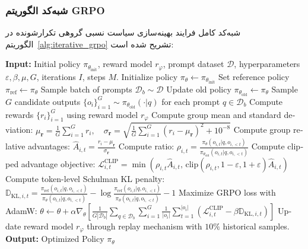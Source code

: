 \subsubsection*{شبه‌کد الگوریتم GRPO}

شبه‌کد کامل فرایند بهینه‌سازی سیاست نسبی گروهی تکرارشونده در الگوریتم~\ref{alg:iterative_grpo} تشریح شده است:

\begin{latin}
\begin{algorithm}[H]
\caption{Iterative Group Relative Policy Optimization (GRPO)}
\label{alg:iterative_grpo}
\begin{algorithmic}[1]
\State \textbf{Input:} Initial policy $\pi_{\theta_{\text{init}}}$, reward model $r_\varphi$, prompt dataset $\mathcal{D}$, hyperparameters $\varepsilon, \beta, \mu, G$, iterations $I$, steps $M$.
\State Initialize policy $\pi_\theta \leftarrow \pi_{\theta_{\text{init}}}$
    \State Set reference policy $\pi_{\text{ref}} \leftarrow \pi_\theta$
        \State Sample batch of prompts $\mathcal{D}_b \sim \mathcal{D}$
        \State Update old policy $\pi_{\theta_{\text{old}}} \leftarrow \pi_\theta$
        \State Sample $G$ candidate outputs $\{o_i\}_{i=1}^G \sim \pi_{\theta_{\text{old}}}(\cdot | q)$ for each prompt $q \in \mathcal{D}_b$
        \State Compute rewards $\{r_i\}_{i=1}^G$ using reward model $r_\varphi$
        \State Compute group mean and standard deviation:
        \State \quad $\mu_{\mathbf{r}} = \frac{1}{G}\sum_{i=1}^G r_i, \quad \sigma_{\mathbf{r}} = \sqrt{\frac{1}{G}\sum_{i=1}^G (r_i - \mu_{\mathbf{r}})^2 + 10^{-8}}$
        \State Compute group relative advantages: $\hat{A}_{i,t} = \frac{r_i - \mu_{\mathbf{r}}}{\sigma_{\mathbf{r}}}$
            \State Compute ratio: $\rho_{i,t} = \frac{\pi_\theta(o_{i,t} | q, o_{i,<t})}{\pi_{\theta_{\text{old}}}(o_{i,t} | q, o_{i,<t})}$
            \State Compute clipped advantage objective:
            \State \quad $\mathcal{L}_{i,t}^{\text{CLIP}} = \min\left( \rho_{i,t} \hat{A}_{i,t}, \, \text{clip}(\rho_{i,t}, 1-\varepsilon, 1+\varepsilon)\hat{A}_{i,t} \right)$
            \State Compute token-level Schulman KL penalty:
            \State \quad $\mathbb{D}_{\text{KL}, i, t} = \frac{\pi_{\text{ref}}(o_{i,t}|q, o_{i,<t})}{\pi_\theta(o_{i,t}|q, o_{i,<t})} - \log \frac{\pi_{\text{ref}}(o_{i,t}|q, o_{i,<t})}{\pi_\theta(o_{i,t}|q, o_{i,<t})} - 1$
            \State Maximize GRPO loss with AdamW:
            \State \quad $\theta \leftarrow \theta + \alpha \nabla_\theta \left[ \frac{1}{G|\mathcal{D}_b|} \sum_{q \in \mathcal{D}_b} \sum_{i=1}^G \frac{1}{|o_i|} \sum_{t=1}^{|o_i|} \left( \mathcal{L}_{i,t}^{\text{CLIP}} - \beta \mathbb{D}_{\text{KL}, i, t} \right) \right]$
        \EndFor
        \State Update reward model $r_\varphi$ through replay mechanism with $10\%$ historical samples.
    \EndFor
\EndFor
\State \textbf{Output:} Optimized Policy $\pi_\theta$
\end{algorithmic}
\end{algorithm}
\end{latin}

